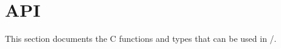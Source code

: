 %
%
%
%

\section{API}

This section documents the C functions and types that can be used in \ANLOpenCL/.






